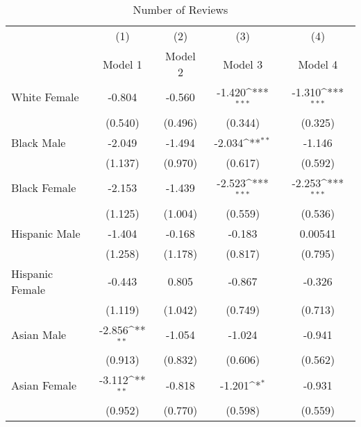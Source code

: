 \begin{table}[htbp]\centering
\def\sym#1{\ifmmode^{#1}\else\(^{#1}\)\fi}
\caption{Number of Reviews}
\begin{tabular}{l*{4}{c}}
\hline\hline
                    &\multicolumn{1}{c}{(1)}&\multicolumn{1}{c}{(2)}&\multicolumn{1}{c}{(3)}&\multicolumn{1}{c}{(4)}\\
                    &\multicolumn{1}{c}{Model 1}&\multicolumn{1}{c}{Model 2}&\multicolumn{1}{c}{Model 3}&\multicolumn{1}{c}{Model 4}\\
\hline
White Female        &      -0.804         &      -0.560         &      -1.420\sym{***}&      -1.310\sym{***}\\
                    &     (0.540)         &     (0.496)         &     (0.344)         &     (0.325)         \\
[1em]
Black Male          &      -2.049         &      -1.494         &      -2.034\sym{**} &      -1.146         \\
                    &     (1.137)         &     (0.970)         &     (0.617)         &     (0.592)         \\
[1em]
Black Female        &      -2.153         &      -1.439         &      -2.523\sym{***}&      -2.253\sym{***}\\
                    &     (1.125)         &     (1.004)         &     (0.559)         &     (0.536)         \\
[1em]
Hispanic Male       &      -1.404         &      -0.168         &      -0.183         &     0.00541         \\
                    &     (1.258)         &     (1.178)         &     (0.817)         &     (0.795)         \\
[1em]
Hispanic Female     &      -0.443         &       0.805         &      -0.867         &      -0.326         \\
                    &     (1.119)         &     (1.042)         &     (0.749)         &     (0.713)         \\
[1em]
Asian Male          &      -2.856\sym{**} &      -1.054         &      -1.024         &      -0.941         \\
                    &     (0.913)         &     (0.832)         &     (0.606)         &     (0.562)         \\
[1em]
Asian Female        &      -3.112\sym{**} &      -0.818         &      -1.201\sym{*}  &      -0.931         \\
                    &     (0.952)         &     (0.770)         &     (0.598)         &     (0.559)         \\

\end{tabular}
\end{table}
